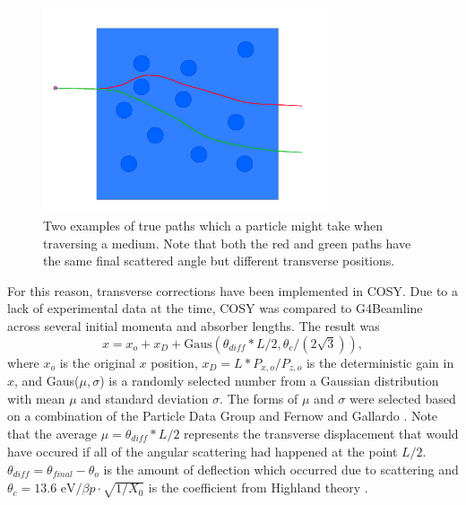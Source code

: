 \begin{figure}
  \centering
    \includegraphics[width=0.75\textwidth]{Figures/lateral_displacement} 
  \caption[Two examples of true paths.]{Two examples of true paths which a particle might take when traversing a medium. Note that both the red and green paths have the same final scattered angle but different transverse positions.}
  \label{fig:lateral_displacement}
\end{figure}

For this reason, transverse corrections have been implemented in  COSY. Due to a lack of experimental data at the time, COSY was compared to G4Beamline across several initial momenta and absorber lengths. The result was
\begin{equation}\label{eqn:cosylatdis}
x = x_o + x_D+\text{Gaus}(\theta_\textit{diff} *L/2,\theta_c /(2\sqrt{3})),
\end{equation}
where $x_o$ is the original $x$ position, $x_D = L*P_{x,o}/P_{z,o}$ is the deterministic  gain in $x$, and Gaus($\mu,\sigma$) is a randomly selected number from a Gaussian distribution with mean $\mu$ and standard deviation $\sigma$. The forms of $\mu$ and $\sigma$ were selected based on a combination of the Particle Data Group \cite{PDG} and Fernow and Gallardo  \cite{fernowAndGallardo}. Note that the average $\mu=\theta_\textit{diff}*L/2$ represents the transverse displacement that would have occured if all of the angular scattering had happened at the point $L/2$. $\theta_\textit{diff}=\theta_\textit{final}-\theta_o$ is the amount of deflection which occurred due to scattering and $\theta_c=13.6 \text{ eV}/\beta p \cdot \sqrt{1/X_0}$ is the coefficient from Highland theory \cite{highland}.

